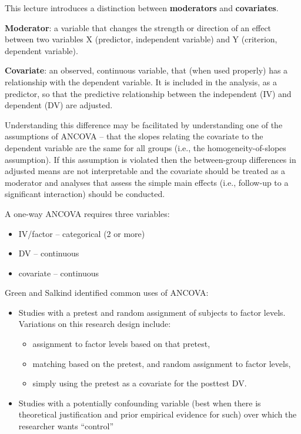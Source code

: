\documentclass[
  11pt,
]{book}
\providecommand{\tightlist}{%
  \setlength{\itemsep}{0pt}\setlength{\parskip}{0pt}}
\begin{document}
This lecture introduces a distinction between \textbf{moderators} and \textbf{covariates}.

\textbf{Moderator}: a variable that changes the strength or direction of an effect between two variables X (predictor, independent variable) and Y (criterion, dependent variable).

\textbf{Covariate}: an observed, continuous variable, that (when used properly) has a relationship with the dependent variable. It is included in the analysis, as a predictor, so that the predictive relationship between the independent (IV) and dependent (DV) are adjusted.

Understanding this difference may be facilitated by understanding one of the assumptions of ANCOVA -- that the slopes relating the covariate to the dependent variable are the same for all groups (i.e., the homogeneity-of-slopes assumption). If this assumption is violated then the between-group differences in adjusted means are not interpretable and the covariate should be treated as a moderator and analyses that assess the simple main effects (i.e., follow-up to a significant interaction) should be conducted.

A one-way ANCOVA requires three variables:

\begin{itemize}
\tightlist
\item
  IV/factor -- categorical (2 or more)
\item
  DV -- continuous
\item
  covariate -- continuous
\end{itemize}

Green and Salkind \citeyearpar{green_one-way_2017} identified common uses of ANCOVA:

\begin{itemize}
\tightlist
\item
  Studies with a pretest and random assignment of subjects to factor levels. Variations on this research design include:

  \begin{itemize}
  \tightlist
  \item
    assignment to factor levels based on that pretest,
  \item
    matching based on the pretest, and random assignment to factor levels,
  \item
    simply using the pretest as a covariate for the posttest DV.
  \end{itemize}
\item
  Studies with a potentially confounding variable (best when there is theoretical justification and prior empirical evidence for such) over which the researcher wants ``control''
\end{itemize}
\end{document}
